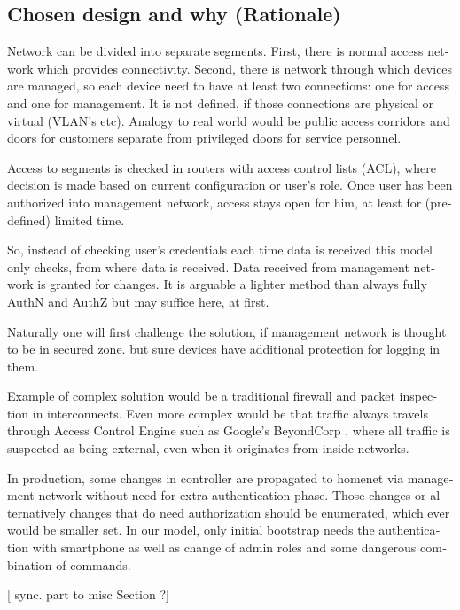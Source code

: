 \documentclass[12pt,a4paper,english]{tutthesis}
\begin{document}
\begin{otherlanguage}{english}
\section{Chosen design and why (Rationale)}
\label{sec-4-3}
\label{sec:chosendesign}   
Network can be divided into separate segments. 
First, there is normal access network which provides
connectivity. Second, there is network through which devices are
managed, so each device need to have at least two connections: one for
access and one for management. It is not defined, if those connections
are physical or virtual (VLAN's etc). 
Analogy to real world would be public access corridors and doors for
customers separate from privileged doors for service personnel.

Access to segments is checked in routers with access control lists
(ACL), where decision is made based on current configuration or user's
role.  Once user has been authorized into management network, access
stays open for him, at least for (predefined) limited time.

So, instead of checking user's credentials each time data is received
this model only checks, from where data is received. 
Data received from management network is granted for changes.
It is arguable a lighter method than always
fully AuthN and AuthZ but may suffice here, at first.

Naturally one will first challenge the solution, if
management network is thought to be in secured zone.
but sure devices have additional protection for logging in them. 


Example of complex solution would be a traditional firewall and packet
inspection in interconnects. Even more complex would be that traffic
always travels through Access Control Engine such as Google's
BeyondCorp \cite{2014-beyondcorp}, where all
traffic is suspected as being external, even when it originates from inside networks.


In production, some changes in controller are propagated to homenet
via management network without need for extra authentication phase.  
Those changes or alternatively changes that do need authorization
should be enumerated, which ever would be smaller set. In our model,
only initial bootstrap needs the authentication with smartphone as
well as change of admin roles and some dangerous combination of commands.

[ sync. part to misc Section ?]






\end{otherlanguage}
\end{document}

